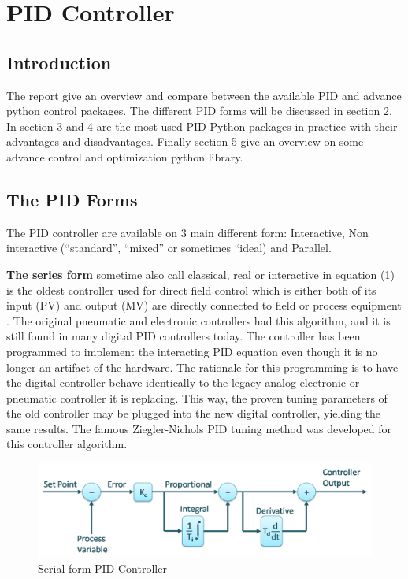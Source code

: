\section{PID Controller}

\subsection{Introduction}

The report give an overview and compare between the available PID and advance python control packages. The different PID forms will be discussed in section 2. In section 3 and 4 are the most used PID Python packages in practice with their advantages and disadvantages. Finally section 5 give an overview on some advance control and optimization python library.

\subsection{The PID Forms}

The PID controller are available on 3 main different form: Interactive, Non interactive (“standard”, “mixed” or sometimes “ideal) and Parallel.  

\textbf{The series form} sometime also call classical, real or interactive in equation (1) is the oldest controller used for direct field control which is either both of its input (PV) and output (MV) are directly connected to field or process equipment \cite{Wolfgang}. The original pneumatic and electronic controllers had this algorithm, and it is still found in many digital PID controllers today. The controller has been programmed to implement the interacting PID equation even though it is no longer an artifact of the hardware. The rationale for this programming is to have the digital controller behave identically to the legacy analog electronic or pneumatic controller it is replacing. This way, the proven tuning parameters of the old controller may be plugged into the new digital controller, yielding the same results.  
The famous Ziegler-Nichols PID tuning method was developed for this controller algorithm. 

\begin{figure}[H]
	\centering
	\includegraphics[width=0.8\columnwidth]{Pictures/series.png}
	\caption[Short title]{Serial form PID Controller \cite{PID}}
	\label{figure: Serial PID}
\end{figure}

